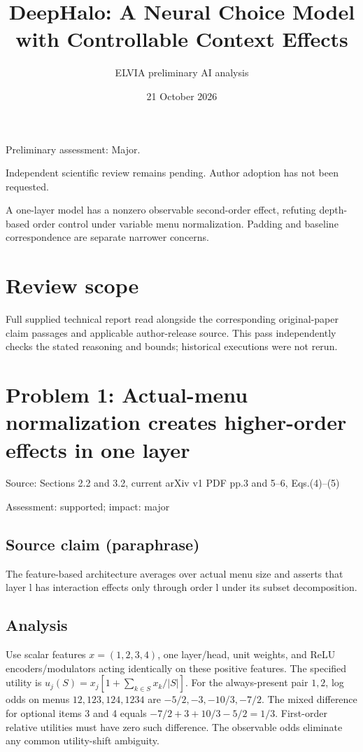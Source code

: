 \documentclass[11pt]{article}
\begin{document}
\title{DeepHalo: A Neural Choice Model with Controllable Context Effects}

\author{ELVIA preliminary AI analysis}\date{21 October 2026}\maketitle

Preliminary assessment: Major.\par

Independent scientific review remains pending. Author adoption has not been requested.

A one-layer model has a nonzero observable second-order effect, refuting depth-based order control under variable menu normalization. Padding and baseline correspondence are separate narrower concerns.

\section*{Review scope}

Full supplied technical report read alongside the corresponding original-paper claim passages and applicable author-release source. This pass independently checks the stated reasoning and bounds; historical executions were not rerun.

\section*{Problem 1: Actual-menu normalization creates higher-order effects in one layer}

Source: Sections 2.2 and 3.2, current arXiv v1 PDF pp.3 and 5–6, Eqs.(4)–(5)

Assessment: supported; impact: major

\subsection*{Source claim (paraphrase)}

The feature-based architecture averages over actual menu size and asserts that layer l has interaction effects only through order l under its subset decomposition.

\subsection*{Analysis}

Use scalar features \(x=(1,2,3,4)\), one layer/head, unit weights, and ReLU encoders/modulators acting identically on these positive features. The specified utility is \(u_j(S)=x_j[1+\sum_{k\in S}x_k/|S|]\). For the always-present pair \(1,2\), log odds on menus \(12,123,124,1234\) are \(-5/2,-3,-10/3,-7/2\). The mixed difference for optional items 3 and 4 equals \(-7/2+3+10/3-5/2=1/3\). First-order relative utilities must have zero such difference. The observable odds eliminate any common utility-shift ambiguity.
\end{document}
